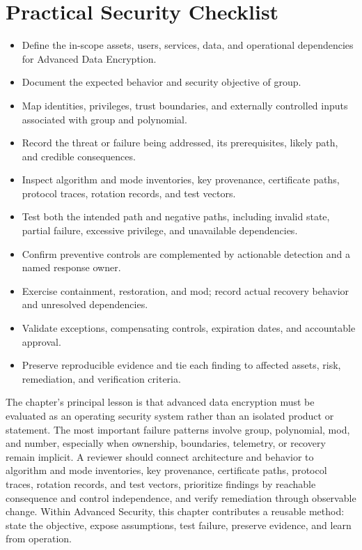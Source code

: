 \documentclass[11pt]{article}
\begin{document}
\section*{Practical Security Checklist}
\begin{itemize}[label=$\square$]
\item Define the in-scope assets, users, services, data, and operational dependencies for Advanced Data Encryption.
\item Document the expected behavior and security objective of group.
\item Map identities, privileges, trust boundaries, and externally controlled inputs associated with group and polynomial.
\item Record the threat or failure being addressed, its prerequisites, likely path, and credible consequences.
\item Inspect algorithm and mode inventories, key provenance, certificate paths, protocol traces, rotation records, and test vectors.
\item Test both the intended path and negative paths, including invalid state, partial failure, excessive privilege, and unavailable dependencies.
\item Confirm preventive controls are complemented by actionable detection and a named response owner.
\item Exercise containment, restoration, and mod; record actual recovery behavior and unresolved dependencies.
\item Validate exceptions, compensating controls, expiration dates, and accountable approval.
\item Preserve reproducible evidence and tie each finding to affected assets, risk, remediation, and verification criteria.
\end{itemize}
\begin{synthesisbox}
The chapter's principal lesson is that advanced data encryption must be evaluated as an operating security system rather than an isolated product or statement. The most important failure patterns involve group, polynomial, mod, and number, especially when ownership, boundaries, telemetry, or recovery remain implicit. A reviewer should connect architecture and behavior to algorithm and mode inventories, key provenance, certificate paths, protocol traces, rotation records, and test vectors, prioritize findings by reachable consequence and control independence, and verify remediation through observable change. Within Advanced Security, this chapter contributes a reusable method: state the objective, expose assumptions, test failure, preserve evidence, and learn from operation.
\end{synthesisbox}
\end{document}
